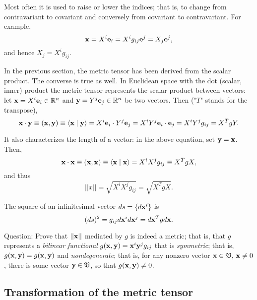 Most often it is used to raise or lower the indices; that is,
to change from contravariant to covariant and conversely from covariant
to contravariant.
{
\color{blue}
\bexample
For example,
\begin{equation}
{\bf x} =
X^i {\bf e}_i = X^i g_{ij} {\bf e}^j   = X_j {\bf e}^j,
\end{equation}
and hence $X_j = X^i g_{ij}$.
\eexample
}


In the previous section, the metric tensor has been derived from the scalar product.
The converse is true as well.
In Euclidean space with the dot (scalar, inner) product
the metric tensor represents the scalar product between vectors: let
${\bf x}=X^i{\bf e}_i \in {\Bbb R}^n$ and ${\bf y}=Y^j{\bf e}_j \in {\Bbb R}^n$ be two vectors.
Then ("$T$" stands for the transpose),
\begin{equation}
{\bf x}\cdot {\bf y}\equiv ({\bf x},{\bf y})\equiv \langle {\bf x}\mid {\bf y}\rangle
= X^i {\bf e}_i\cdot Y^j {\bf e}_j
= X^iY^j {\bf e}_i\cdot  {\bf e}_j
=X^iY^j g_{ij}= X^T g Y.
\end{equation}

It also characterizes the length of a vector: in the above
equation, set ${\bf y}={\bf x}$. Then,
\begin{equation}
{\bf x}\cdot {\bf x}\equiv ({\bf x},{\bf x})\equiv \langle {\bf x}\mid {\bf x}\rangle
=X^iX^j g_{ij}\equiv X^T g X,
\end{equation}
and thus
\begin{equation}
\vert\vert  x\vert\vert  =\sqrt{X^iX^j g_{ij}}= \sqrt{X^T g X}.
\end{equation}


The square of an infinitesimal vector $ds =\{d{\bf x}^i\}$ is
\begin{equation}
(d s)^2  = g_{ij}d{\bf x}^id{\bf x}^j= d{\bf x}^T g d{\bf x}.
\end{equation}


Question: Prove that $\vert\vert  {\bf x}\vert\vert $ mediated by $g$ is
indeed a metric; that is, that
$g$ represents a {\em bilinear functional}
$g({\bf x},{\bf y}) ={\bf x}^i{\bf y}^j g_{ij}$ that is {\em symmetric}; that is,
$g({\bf x},{\bf y}) = g({\bf x},{\bf y})$
and {\em nondegenerate}; that is, for any nonzero vector ${\bf x}\in {\frak V}$,   ${\bf x}\neq 0$,
there is some  vector  ${\bf y}\in {\frak V}$, so that  $g({\bf x},{\bf y}) \neq 0$.

\subsection{Transformation of the metric tensor}

